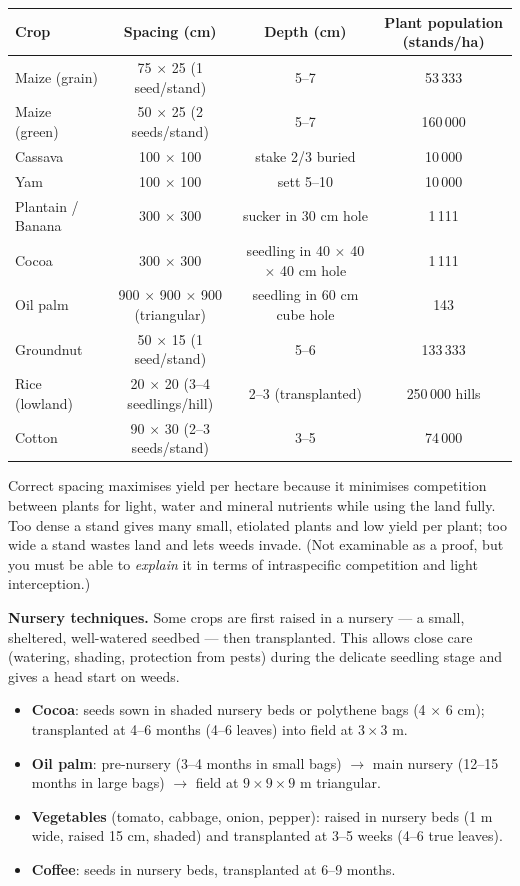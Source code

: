 \documentclass[11pt]{article}
\newcommand{\cle}[1]{{\popxbold\color{popdark}#1}}
\begin{document}
\begin{center}
\begin{tabular}{|l|c|c|c|}
\hline
\rowcolor{popblueL} \textbf{Crop} & \textbf{Spacing (cm)} & \textbf{Depth (cm)} & \textbf{Plant population (stands/ha)} \\
\hline
Maize (grain) & 75 $\times$ 25 (1 seed/stand) & 5--7 & 53\,333 \\
Maize (green) & 50 $\times$ 25 (2 seeds/stand) & 5--7 & 160\,000 \\
Cassava & 100 $\times$ 100 & stake 2/3 buried & 10\,000 \\
Yam & 100 $\times$ 100 & sett 5--10 & 10\,000 \\
Plantain / Banana & 300 $\times$ 300 & sucker in 30 cm hole & 1\,111 \\
Cocoa & 300 $\times$ 300 & seedling in 40 $\times$ 40 $\times$ 40 cm hole & 1\,111 \\
Oil palm & 900 $\times$ 900 $\times$ 900 (triangular) & seedling in 60 cm cube hole & 143 \\
Groundnut & 50 $\times$ 15 (1 seed/stand) & 5--6 & 133\,333 \\
Rice (lowland) & 20 $\times$ 20 (3--4 seedlings/hill) & 2--3 (transplanted) & 250\,000 hills \\
Cotton & 90 $\times$ 30 (2--3 seeds/stand) & 3--5 & 74\,000 \\
\hline
\end{tabular}
\end{center}

\begin{propriete}
Correct spacing maximises yield per hectare because it minimises \cle{competition} between plants for light, water and mineral nutrients while using the land fully. Too dense a stand gives many small, etiolated plants and low yield per plant; too wide a stand wastes land and lets weeds invade. (Not examinable as a proof, but you must be able to \emph{explain} it in terms of intraspecific competition and light interception.)
\end{propriete}

\textbf{Nursery techniques.} Some crops are first raised in a \cle{nursery} — a small, sheltered, well-watered seedbed — then transplanted. This allows close care (watering, shading, protection from pests) during the delicate seedling stage and gives a head start on weeds.

\begin{itemize}
\item \textbf{Cocoa}: seeds sown in shaded nursery beds or polythene bags (4 $\times$ 6 cm); transplanted at 4--6 months (4--6 leaves) into field at $3 \times 3$ m.
\item \textbf{Oil palm}: pre-nursery (3--4 months in small bags) $\rightarrow$ main nursery (12--15 months in large bags) $\rightarrow$ field at $9 \times 9 \times 9$ m triangular.
\item \textbf{Vegetables} (tomato, cabbage, onion, pepper): raised in nursery beds (1 m wide, raised 15 cm, shaded) and transplanted at 3--5 weeks (4--6 true leaves).
\item \textbf{Coffee}: seeds in nursery beds, transplanted at 6--9 months.
\end{itemize}
\end{document}
